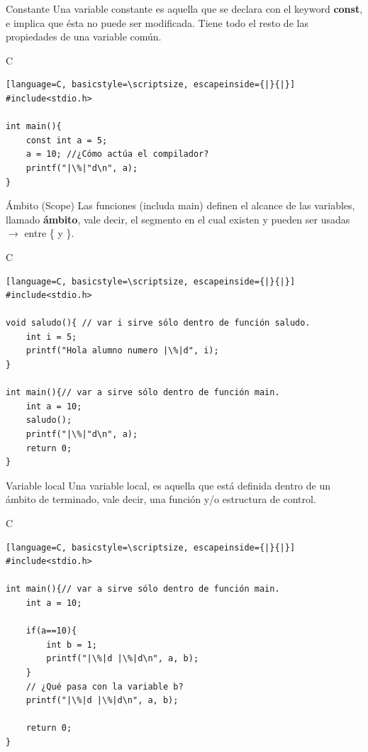 \documentclass{beamer}
\begin{document}
\begin{frame}[fragile]{Constante}
Una variable constante es aquella que se declara con el keyword \textbf{const}, e implica que ésta no puede ser modificada. Tiene todo el resto de las propiedades de una variable común.

\begin{exampleblock}{C}
\begin{lstlisting}[language=C, basicstyle=\scriptsize, escapeinside={|}{|}]
#include<stdio.h>

int main(){
	const int a = 5;
	a = 10; //¿Cómo actúa el compilador?
	printf("|\%|"d\n", a);
}
\end{lstlisting}\end{exampleblock}
\end{frame}

\begin{frame}[fragile]{Ámbito (Scope)}
Las funciones (includa main) definen el alcance de las variables, llamado \textbf{ámbito}, vale decir, el segmento en el cual existen y pueden ser usadas $\rightarrow$ entre \{ y \}.

\begin{exampleblock}{C}
\begin{lstlisting}[language=C, basicstyle=\scriptsize, escapeinside={|}{|}]
#include<stdio.h>

void saludo(){ // var i sirve sólo dentro de función saludo.
	int i = 5;
	printf("Hola alumno numero |\%|d", i);
}

int main(){// var a sirve sólo dentro de función main. 
	int a = 10;
	saludo();
	printf("|\%|"d\n", a);
	return 0;
}
\end{lstlisting}\end{exampleblock}
\end{frame}

\begin{frame}[fragile]{Variable local}
Una variable local, es aquella que está definida dentro de un ámbito de terminado, vale decir, una función y/o estructura de control. 

\begin{exampleblock}{C}
\begin{lstlisting}[language=C, basicstyle=\scriptsize, escapeinside={|}{|}]
#include<stdio.h>

int main(){// var a sirve sólo dentro de función main. 
	int a = 10;

	if(a==10){
		int b = 1;
		printf("|\%|d |\%|d\n", a, b);
	}
	// ¿Qué pasa con la variable b?
	printf("|\%|d |\%|d\n", a, b); 

	return 0;
}
\end{lstlisting}\end{exampleblock}
\end{frame}
\end{document}
